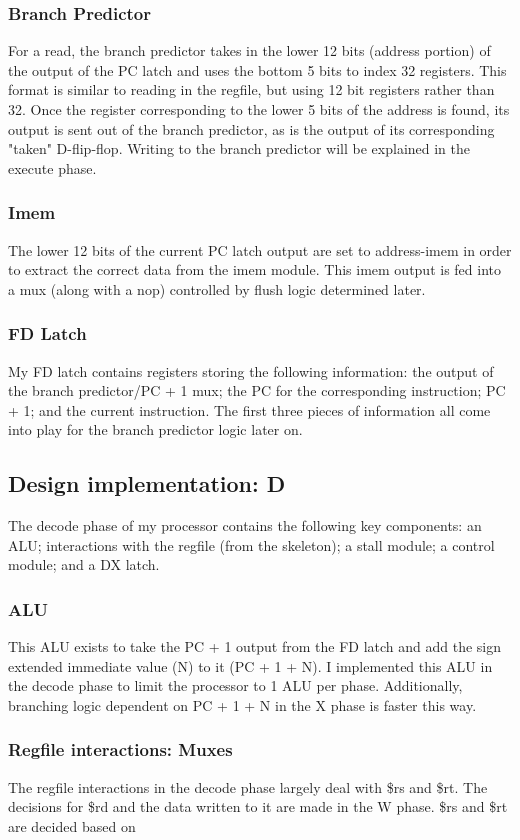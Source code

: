 \documentclass[letterpaper]{article} %
\begin{document}
\subsubsection{Branch Predictor}
For a read, the branch predictor takes in the lower 12 bits (address portion) of the output of the PC latch and uses the bottom 5 bits to index 32 registers. This format is similar to reading in the regfile, but using 12 bit registers rather than 32. Once the register corresponding to the lower 5 bits of the address is found, its output is sent out of the branch predictor, as is the output of its corresponding "taken" D-flip-flop. Writing to the branch predictor will be explained in the execute phase.
\subsubsection{Imem}
The lower 12 bits of the current PC latch output are set to address-imem in order to extract the correct data from the imem module. This imem output is fed into a mux (along with a nop) controlled by flush logic determined later.
\subsubsection{FD Latch}
My FD latch contains registers storing the following information: the output of the branch predictor/PC + 1 mux; the PC for the corresponding instruction; PC + 1; and the current instruction. The first three pieces of information all come into play for the branch predictor logic later on.

\subsection{Design implementation: D}
The decode phase of my processor contains the following key components: an ALU; interactions with the regfile (from the skeleton); a stall module; a control module; and a DX latch.
\subsubsection{ALU}
This ALU exists to take the PC + 1 output from the FD latch and add the sign extended immediate value (N) to it (PC + 1 + N). I implemented this ALU in the decode phase to limit the processor to 1 ALU per phase. Additionally, branching logic dependent on PC + 1 + N in the X phase is faster this way.
\subsubsection{Regfile interactions: Muxes}
The regfile interactions in the decode phase largely deal with \$rs and \$rt. The decisions for \$rd and the data written to it are made in the W phase. \$rs and \$rt are decided based on 
\end{document}
